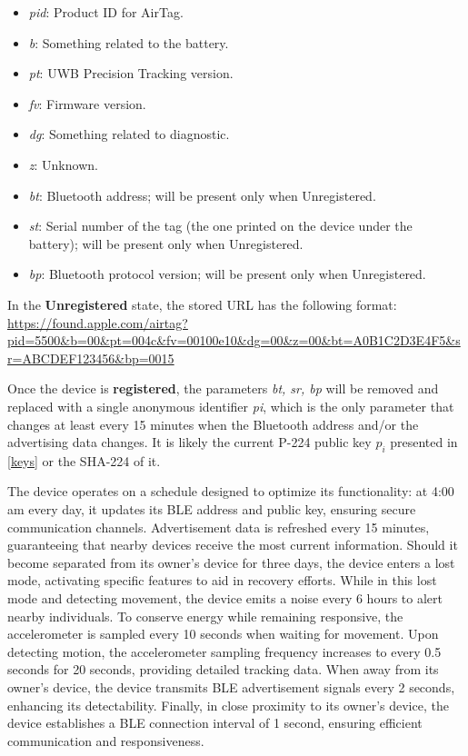 \documentclass[english]{article}
\begin{document}
\begin{itemize}
  \item \textit{pid}: Product ID for AirTag.
  \item \textit{b}: Something related to the battery.
  \item \textit{pt}: UWB Precision Tracking version.
  \item \textit{fv}: Firmware version.
  \item \textit{dg}: Something related to diagnostic.
  \item \textit{z}: Unknown.
  \item \textit{bt}: Bluetooth address; will be present only when Unregistered.
  \item \textit{st}: Serial number of the tag (the one printed on the device under the battery); will be present only when Unregistered.
  \item \textit{bp}: Bluetooth protocol version; will be present only when Unregistered.
\end{itemize}
In the \textbf{Unregistered} state, the stored URL has the following format:
\url{https://found.apple.com/airtag?pid=5500&b=00&pt=004c&fv=00100e10&dg=00&z=00&bt=A0B1C2D3E4F5&sr=ABCDEF123456&bp=0015}

Once the device is \textbf{registered}, the parameters \textit{bt, sr, bp} will be removed and replaced with a single anonymous identifier \textit{pi}, which is the only parameter that changes at least every 15 minutes when the Bluetooth address and/or the advertising data changes. It is likely the current P-224 public key $p_i$ presented in \ref{keys} or the SHA-224 of it. 


The device operates on a schedule designed to optimize its functionality:
at 4:00 am every day, it updates its BLE address and public key, ensuring secure communication channels.
Advertisement data is refreshed every 15 minutes, guaranteeing that nearby devices receive the most current information.
Should it become separated from its owner's device for three days, the device enters a lost mode, activating specific features to aid in recovery efforts.
While in this lost mode and detecting movement, the device emits a noise every 6 hours to alert nearby individuals.
To conserve energy while remaining responsive, the accelerometer is sampled every 10 seconds when waiting for movement.
Upon detecting motion, the accelerometer sampling frequency increases to every 0.5 seconds for 20 seconds, providing detailed tracking data.
When away from its owner's device, the device transmits BLE advertisement signals every 2 seconds, enhancing its detectability.
Finally, in close proximity to its owner's device, the device establishes a BLE connection interval of 1 second, ensuring efficient communication and responsiveness.
\end{document}
